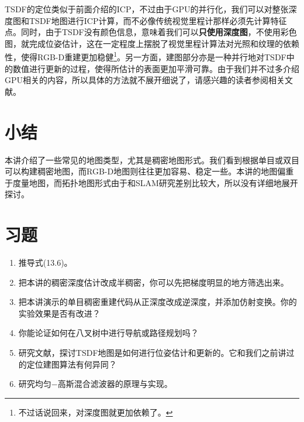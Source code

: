 TSDF的定位类似于前面介绍的ICP，不过由于GPU的并行化，我们可以对整张深度图和TSDF地图进行ICP计算，而不必像传统视觉里程计那样必须先计算特征点。同时，由于TSDF没有颜色信息，意味着我们可以\textbf{只使用深度图}，不使用彩色图，就完成位姿估计，这在一定程度上摆脱了视觉里程计算法对光照和纹理的依赖性，使得RGB-D重建更加稳健\footnote{不过话说回来，对深度图就更加依赖了。}。另一方面，建图部分亦是一种并行地对TSDF中的数值进行更新的过程，使得所估计的表面更加平滑可靠。由于我们并不过多介绍GPU相关的内容，所以具体的方法就不展开细说了，请感兴趣的读者参阅相关文献。

\section{小结}
本讲介绍了一些常见的地图类型，尤其是稠密地图形式。我们看到根据单目或双目可以构建稠密地图，而RGB-D地图则往往更加容易、稳定一些。本讲的地图偏重于度量地图，而拓扑地图形式由于和SLAM研究差别比较大，所以没有详细地展开探讨。

\section*{习题}
\begin{enumerate}
	\item 推导式(13.6)。
	\item 把本讲的稠密深度估计改成半稠密，你可以先把梯度明显的地方筛选出来。
	\item[\optional] 把本讲演示的单目稠密重建代码从正深度改成逆深度，并添加仿射变换。你的实验效果是否有改进？
	\item 你能论证如何在八叉树中进行导航或路径规划吗？
	\item 研究文献\cite{Newcombe2011}，探讨TSDF地图是如何进行位姿估计和更新的。它和我们之前讲过的定位建图算法有何异同？
	\item[\optional] 研究均匀−高斯混合滤波器的原理与实现。
\end{enumerate}
